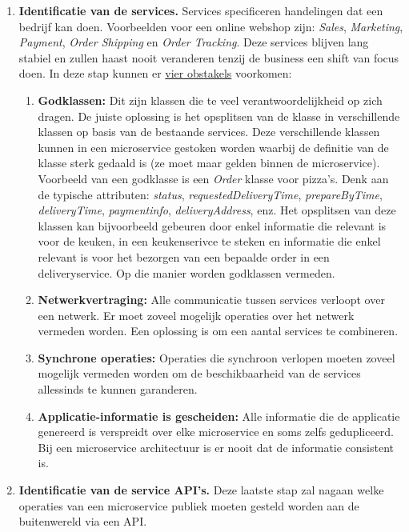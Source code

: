 \begin{enumerate}
		\item[\info]\textbf{Identificatie van de services.} Services specificeren handelingen dat een bedrijf kan doen. Voorbeelden voor een online webshop zijn: \textit{Sales}, \textit{Marketing}, \textit{Payment}, \textit{Order Shipping} en \textit{Order Tracking}. Deze services blijven lang stabiel en zullen haast nooit veranderen tenzij de business een shift van focus doen. In deze stap kunnen er \uline{vier obstakels} voorkomen:
		\begin{enumerate}
			\item \textbf{Godklassen:} Dit zijn klassen die te veel verantwoordelijkheid op zich dragen. De juiste oplossing is het opsplitsen van de klasse in verschillende klassen op basis van de bestaande services. Deze verschillende klassen kunnen in een microservice gestoken worden waarbij de definitie van de klasse sterk gedaald is (ze moet maar gelden binnen de microservice). Voorbeeld van een godklasse is een \emph{Order} klasse voor pizza's. Denk aan de typische attributen: \textit{status}, \textit{requestedDeliveryTime}, \textit{prepareByTime}, \textit{deliveryTime}, \textit{paymentinfo}, \textit{deliveryAddress}, enz. Het opsplitsen van deze klassen kan bijvoorbeeld gebeuren door enkel informatie die relevant is voor de keuken, in een keukenserivce te steken en informatie die enkel relevant is voor het bezorgen van een bepaalde order in een deliveryservice. Op die manier worden godklassen vermeden.
			\item \textbf{Netwerkvertraging:} Alle communicatie tussen services verloopt over een netwerk. Er moet zoveel mogelijk operaties over het netwerk vermeden worden. Een oplossing is om een aantal services te combineren.
			\item \textbf{Synchrone operaties:} Operaties die synchroon verlopen moeten zoveel mogelijk vermeden worden om de beschikbaarheid van de services allessinds te kunnen garanderen. 
			\item \textbf{Applicatie-informatie is gescheiden:} Alle informatie die de applicatie genereerd is verspreidt over elke microservice en soms zelfs gedupliceerd. Bij een microservice architectuur is er nooit dat de informatie consistent is. 
		\end{enumerate}

		\item[\info]\textbf{Identificatie van de service API's.} Deze laatste stap zal nagaan welke operaties van een microservice publiek moeten gesteld worden aan de buitenwereld via een API. 
	\end{enumerate}

